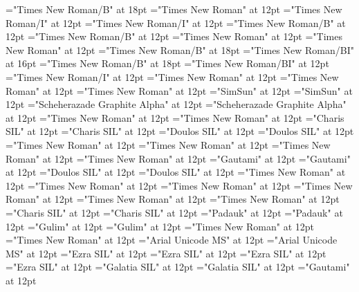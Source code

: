 \documentclass[a4paper]{article}
\begin{document}
\font\ChapterNumberParagraphscrSectioncolumnsscrBookscrBody="Times New Roman/B" at 18pt
\font\ParagraphscrSectioncolumnsscrBookscrBody="Times New Roman" at 12pt
\font\spanParallelPassageReferencescrSectioncolumnsscrBookscrBody="Times New Roman/I" at 12pt
\font\ParallelPassageReferencescrSectioncolumnsscrBookscrBody="Times New Roman/I" at 12pt
\font\spanSectionHeadscrSectioncolumnsscrBookscrBody="Times New Roman/B" at 12pt
\font\SectionHeadscrSectioncolumnsscrBookscrBody="Times New Roman/B" at 12pt
\font\scrSectioncolumnsscrBookscrBody="Times New Roman" at 12pt
\font\columnsscrBookscrBody="Times New Roman" at 12pt
\font\spanTitleMainscrBookscrBody="Times New Roman/B" at 18pt
\font\TitleSecondaryTitleMainscrBookscrBody="Times New Roman/BI" at 16pt
\font\TitleMainscrBookscrBody="Times New Roman/B" at 18pt
\font\scrBookCodescrBookscrBody="Times New Roman/BI" at 12pt
\font\scrBookNamescrBookscrBody="Times New Roman/I" at 12pt
\font\scrBookscrBody="Times New Roman" at 12pt
\font\imgpicturedivpictureLeft="Times New Roman" at 12pt
\font\picturepictureRight="Times New Roman" at 12pt
\font\spanzhCN="SimSun" at 12pt
\font\divzhCN="SimSun" at 12pt
\font\spanur="Scheherazade Graphite Alpha" at 12pt
\font\divur="Scheherazade Graphite Alpha" at 12pt
\font\spanurxind="Times New Roman" at 12pt
\font\divurxind="Times New Roman" at 12pt
\font\spantr="Charis SIL" at 12pt
\font\divtr="Charis SIL" at 12pt
\font\spantrfonipa="Doulos SIL" at 12pt
\font\divtrfonipa="Doulos SIL" at 12pt
\font\spantrfonipaxemic="Times New Roman" at 12pt
\font\divtrfonipaxemic="Times New Roman" at 12pt
\font\spantpi="Times New Roman" at 12pt
\font\divtpi="Times New Roman" at 12pt
\font\spante="Gautami" at 12pt
\font\divte="Gautami" at 12pt
\font\spanseh="Doulos SIL" at 12pt
\font\divseh="Doulos SIL" at 12pt
\font\spanru="Times New Roman" at 12pt
\font\divru="Times New Roman" at 12pt
\font\spanqaaxcam="Times New Roman" at 12pt
\font\divqaaxcam="Times New Roman" at 12pt
\font\spanpt="Times New Roman" at 12pt
\font\divpt="Times New Roman" at 12pt
\font\spannko="Charis SIL" at 12pt
\font\divnko="Charis SIL" at 12pt
\font\spanmy="Padauk" at 12pt
\font\divmy="Padauk" at 12pt
\font\spanko="Gulim" at 12pt
\font\divko="Gulim" at 12pt
\font\spanid="Times New Roman" at 12pt
\font\divid="Times New Roman" at 12pt
\font\spanhi="Arial Unicode MS" at 12pt
\font\divhi="Arial Unicode MS" at 12pt
\font\spanhe="Ezra SIL" at 12pt
\font\divhe="Ezra SIL" at 12pt
\font\spanhbo="Ezra SIL" at 12pt
\font\divhbo="Ezra SIL" at 12pt
\font\spangrc="Galatia SIL" at 12pt
\font\divgrc="Galatia SIL" at 12pt
\font\spanggoTeluIN="Gautami" at 12pt
\end{document}
